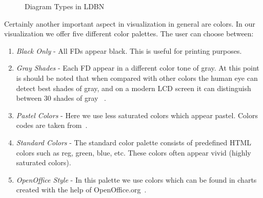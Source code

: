 \begin{figure}[h]
  \centering
\caption{Diagram Types in LDBN}
\end{figure}

Certainly another important aspect in visualization in general are colors.
In our visualization we offer five different color palettes. The user can 
choose between:
\begin{enumerate}
	\item \emph{Black Only} - All FDs appear black. This is useful for printing
	purposes.
	\item \emph{Gray Shades} - Each FD appear in a different color tone of gray. 
	At this point is should be noted that when compared with other colors 
	the human eye can detect best shades of gray, and on a modern LCD screen it can
	distinguish between 30 shades of gray~\cite[Chapter 2]{bimg1} . 
	\item \emph{Pastel Colors} - Here we use less saturated colors which appear pastel. 
	Colors codes are taken from~\cite{wpastel}.
	\item \emph{Standard Colors} - The standard color palette consists of predefined
	HTML colors such as reg, green, blue, etc. These colors often appear vivid 
	(highly saturated colors).
	\item \emph{OpenOffice Style} - In this  palette we use colors which
	can be found in charts created with the help of OpenOffice.org~\cite{wooorg}. 
\end{enumerate}
 
